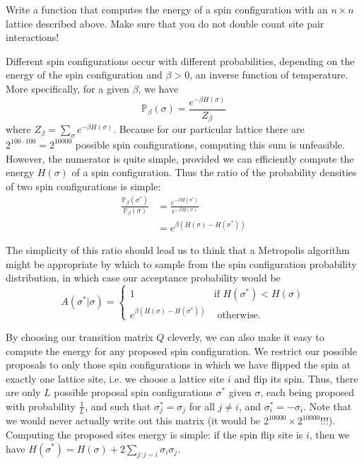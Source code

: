 \begin{problem}
Write a function that computes the energy of a spin configuration with an $n \times n$ lattice described above. Make sure that you do not double count site pair interactions!
\end{problem}

Different spin configurations occur with different probabilities, depending on the energy of the spin configuration and $\beta > 0$, an inverse function of temperature. More specifically, for a given $\beta$, we have
\begin{equation*}
\mathbb{P}_{\beta}(\sigma) = \frac{e^{-\beta H(\sigma)}}{Z_{\beta}}
\end{equation*}
where $Z_{\beta} = \sum_{\sigma} e^{-\beta H(\sigma)}$. Because for our particular lattice there are $2^{100 \cdot 100} = 2^{10000}$ possible spin configurations, computing this sum is unfeasible. However, the numerator is quite simple, provided we can efficiently compute the energy $H(\sigma)$ of a spin configuration. Thus the ratio of the probability densities of two spin configurations is simple:
\begin{align*}
\frac{\mathbb{P}_{\beta}(\sigma^{*})}{\mathbb{P}_{\beta}(\sigma)} & = \frac{e^{-\beta H(\sigma^{*})}}{e^{-\beta H(\sigma)}} \\
& = e^{\beta (H(\sigma) - H(\sigma^{*}))}
\end{align*}

The simplicity of this ratio should lead us to think that a Metropolis algorithm might be appropriate by which to sample from the spin configuration probability distribution, in which case our acceptance probability would be
\begin{equation*}
A(\sigma^{*} | \sigma) = \begin{cases} 1 & \mbox{if } H(\sigma^{*}) < H(\sigma) \\ e^{\beta (H(\sigma) - H(\sigma^{*}))} & \mbox{ otherwise.} \end{cases}
\end{equation*}

By choosing our transition matrix $Q$ cleverly, we can also make it easy to compute the energy for any proposed spin configuration. We restrict our possible proposals to only those spin configurations in which we have flipped the spin at exactly one lattice site, i.e. we choose a lattice site $i$ and flip its spin. Thus, there are only $L$ possible proposal spin configurations $\sigma^{*}$ given $\sigma$, each being proposed with probability $\frac{1}{L}$, and such that $\sigma_{j}^{*} = \sigma_{j}$ for all $j \neq i$, and $\sigma_{i}^{*} = - \sigma_{i}$. Note that we would never actually write out this matrix (it would be $2^{10000} \times 2^{10000}$!!!). Computing the proposed sites energy is simple: if the spin flip site is $i$, then we have $H(\sigma^{*}) = H(\sigma) + 2\sum_{j: j \sim i} \sigma_{i}\sigma_{j}$.

